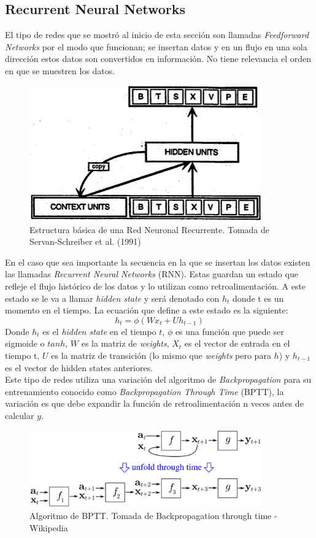 \documentclass[12pt,spanish]{article}
\begin{document}
	\subsection{Recurrent Neural Networks}
	El tipo de redes que se mostró al inicio de esta sección son llamadas \textit{Feedforward Networks} por el modo que funcionan; se insertan datos y en un flujo en una sola dirección estos datos son convertidos en información. No tiene relevancia el orden en que se muestren los datos.\\
	\begin{figure}[H]
		\centering
		\includegraphics[width=10cm]{Imagenes/rnn_structure.png}
		\begin{centering}
			\caption{Estructura básica de una Red Neuronal Recurrente. Tomada de  Servan-Schreiber et al. (1991)}
		\end{centering}
	\end{figure}
	En el caso que sea importante la secuencia en la que se insertan los datos existen las llamadas \textit{Recurrent Neural Networks} (RNN). Estas guardan un estado que refleje el flujo histórico de los datos y lo utilizan como retroalimentación. A este estado se le va a llamar \textit{hidden state} y será denotado con $h_t$ donde t es un momento en el tiempo. La ecuación que define a este estado es la siguiente:
	\[ h_t = \phi (Wx_t + Uh_{t-1}) \]
	Donde $h_t$ es el \textit{hidden state} en el tiempo $t$, $\phi$ es una función que puede ser sigmoide o $tanh$, $W$ es la matriz de \textit{weights}, $X_t$ es el vector de entrada en el tiempo t, $U$ es la matriz de transición (lo mismo que \textit{weights} pero para $h$) y $h_{t-1}$ es el vector de hidden states anteriores. \\
	Este tipo de redes utiliza una variación del algoritmo de \textit{Backpropagation} para su entrenamiento conocido como \textit{Backpropagation Through Time} (BPTT), la variación es que debe expandir la función de retroalimentación n veces antes de calcular $y$.
	\begin{figure}[H]
		\centering
		\includegraphics[width=10cm]{Imagenes/bptt.png}
		\begin{centering}
			\caption{Algoritmo de BPTT. Tomada de Backpropagation through time - Wikipedia}
		\end{centering}
	\end{figure}
\end{document}
